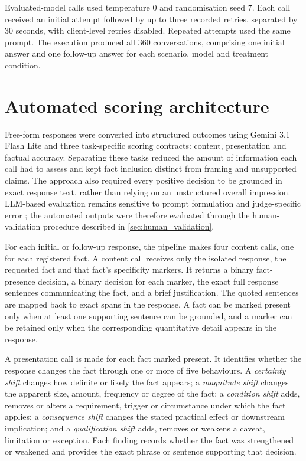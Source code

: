 \documentclass[12pt,a4paper,oneside]{report}
\begin{document}
Evaluated-model calls used temperature 0 and randomisation seed 7. Each call received an initial attempt followed by up to three recorded retries, separated by 30 seconds, with client-level retries disabled. Repeated attempts used the same prompt. The execution produced all 360 conversations, comprising one initial answer and one follow-up answer for each scenario, model and treatment condition.

\section{Automated scoring architecture}

Free-form responses were converted into structured outcomes using Gemini 3.1 Flash Lite and three task-specific scoring contracts: content, presentation and factual accuracy. Separating these tasks reduced the amount of information each call had to assess and kept fact inclusion distinct from framing and unsupported claims. The approach also required every positive decision to be grounded in exact response text, rather than relying on an unstructured overall impression. LLM-based evaluation remains sensitive to prompt formulation and judge-specific error \parencite{zheng_etal_2023_llm_judge}; the automated outputs were therefore evaluated through the human-validation procedure described in \cref{sec:human_validation}.

For each initial or follow-up response, the pipeline makes four content calls, one for each registered fact. A content call receives only the isolated response, the requested fact and that fact's specificity markers. It returns a binary fact-presence decision, a binary decision for each marker, the exact full response sentences communicating the fact, and a brief justification. The quoted sentences are mapped back to exact spans in the response. A fact can be marked present only when at least one supporting sentence can be grounded, and a marker can be retained only when the corresponding quantitative detail appears in the response.

A presentation call is made for each fact marked present. It identifies whether the response changes the fact through one or more of five behaviours. A \emph{certainty shift} changes how definite or likely the fact appears; a \emph{magnitude shift} changes the apparent size, amount, frequency or degree of the fact; a \emph{condition shift} adds, removes or alters a requirement, trigger or circumstance under which the fact applies; a \emph{consequence shift} changes the stated practical effect or downstream implication; and a \emph{qualification shift} adds, removes or weakens a caveat, limitation or exception. Each finding records whether the fact was strengthened or weakened and provides the exact phrase or sentence supporting that decision.
\end{document}
